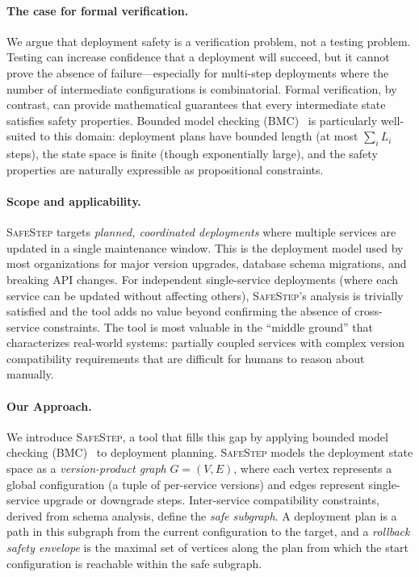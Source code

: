 \documentclass[10pt,twocolumn]{article}
\newcommand{\safestep}{\textsc{SafeStep}}
\begin{document}
\paragraph{The case for formal verification.}
We argue that deployment safety is a verification problem, not
a testing problem. Testing can increase confidence that a
deployment will succeed, but it cannot prove the absence of
failure---especially for multi-step deployments where the number
of intermediate configurations is combinatorial. Formal
verification, by contrast, can provide mathematical guarantees
that every intermediate state satisfies safety properties.
Bounded model checking (BMC)~\cite{biere-bmc-2003} is
particularly well-suited to this domain: deployment plans
have bounded length (at most $\sum_i L_i$ steps), the state
space is finite (though exponentially large), and the safety
properties are naturally expressible as propositional
constraints.

\paragraph{Scope and applicability.}
\safestep{} targets \emph{planned, coordinated deployments}
where multiple services are updated in a single maintenance
window. This is the deployment model used by most organizations
for major version upgrades, database schema migrations, and
breaking API changes. For independent single-service deployments
(where each service can be updated without affecting others),
\safestep{}'s analysis is trivially satisfied and the tool
adds no value beyond confirming the absence of cross-service
constraints. The tool is most valuable in the ``middle ground''
that characterizes real-world systems: partially coupled services
with complex version compatibility requirements that are
difficult for humans to reason about manually.

\paragraph{Our Approach.}
We introduce \safestep{}, a tool that fills this gap by
applying bounded model checking (BMC)~\cite{biere-bmc-2003} to
deployment planning. \safestep{} models the deployment state
space as a \emph{version-product graph} $G = (V, E)$, where
each vertex represents a global configuration (a tuple of
per-service versions) and edges represent single-service
upgrade or downgrade steps. Inter-service compatibility
constraints, derived from schema analysis, define the \emph{safe
subgraph}. A deployment plan is a path in this subgraph from
the current configuration to the target, and a \emph{rollback
safety envelope} is the maximal set of vertices along the plan
from which the start configuration is reachable within the safe
subgraph.
\end{document}
